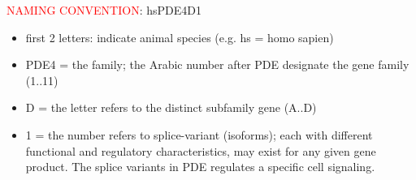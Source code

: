 \textcolor{red}{NAMING CONVENTION}: hsPDE4D1
\label{sec:PDE-name-convention}
\begin{itemize}
  \item first 2 letters: indicate animal species (e.g. hs = homo sapien)
  \item PDE4 = the family; the Arabic number after PDE designate the gene
  family (1..11)

  \item D = the letter refers to the distinct subfamily gene (A..D)
  
  \item 1 = the number refers to splice-variant (isoforms); 
  each with different functional and regulatory characteristics, may exist for
  any given gene product. The splice variants in PDE regulates a specific cell
  signaling.
\end{itemize}


